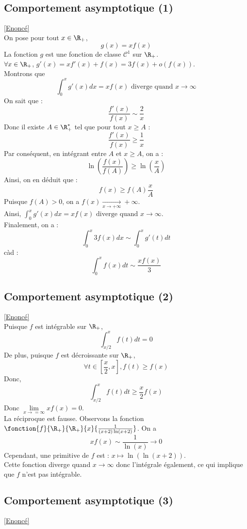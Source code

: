 \documentclass{book}
\begin{document}
	\subsection{Comportement asymptotique (1)}
	\label{Comportement asymptotique (1) corrigé}
	\textcolor{blue}{\hyperref[Comportement asymptotique (1)]{[Enoncé]}}\\
	On pose pour tout $x\in\R_+$, \[g(x)=xf(x)\]
	La fonction $g$ est une fonction de classe $\mathcal{C}^1$ sur $\R_+$.\\
	$\forall x\in\R_+$, $g'(x)=xf'(x)+f(x)=3f(x)+o(f(x))$.\\
	Montrons que \[\int_{0}^{x}g'(x)dx=xf(x) \text{ diverge quand }x\rightarrow \infty\]
	On sait que : \[\frac{f'(x)}{f(x)}\sim \frac{2}{x}\]
	Donc il existe $A\in\R^*_+$ tel que pour tout $x\geq A$ : 
	\[\frac{f'(x)}{f(x)}\geq \frac{1}{x}\]
	Par conséquent, en intégrant entre $A$ et $x\geq A$, on a :
	\[\ln(\frac{f(x)}{f(A)})\geq \ln(\frac{x}{A})\]
	Ainsi, on en déduit que :
	\[f(x)\geq f(A)\frac{x}{A}\]
	Puisque $f(A)>0$, on a $f(x)\underset{x\to+\infty}{\rightarrow}+\infty$.\\
	Ainsi, $\int_{0}^{x}g'(x)dx=xf(x) \text{ diverge quand }x\rightarrow \infty$.\\
	Finalement, on a :
	\[\int_{0}^{x}3f(x)dx\sim \int_{0}^{x}g'(t)dt\]
	càd :
	\[\int_{0}^{x}f(x)dt\sim \frac{xf(x)}{3}\]
	
	
	\subsection{Comportement asymptotique (2)}
	\label{Comportement asymptotique (2) corrigé}
	\textcolor{blue}{\hyperref[Comportement asymptotique (2)]{[Enoncé]}}\\
	Puisque $f$ est intégrable sur $\R_+$, 
	\[\int_{x/2}^{x}f(t)dt=0\]
	De plus, puisque $f$ est décroissante sur $\R_+$,
	\[\forall t\in[\frac{x}{2},x], f(t)\geq f(x)\]
	Donc, \[\int_{x/2}^{x}f(t)dt\geq \frac{x}{2}f(x)\]
	Donc $\lim\limits_{x\to =\infty}xf(x)=0$.\\
	La réciproque est fausse. Observons la fonction $\fonction{f}{\R_+}{\R_+}{x}{\frac{1}{(x+2)\ln(x+2)}}$.
	On a \[xf(x)\sim \frac{1}{\ln(x)}\longrightarrow 0\]
	Cependant, une primitive de $f$ est : $x\mapsto \ln(\ln(x+2))$.\\
	Cette fonction diverge quand $x\to\infty$ donc l'intégrale également, ce qui implique que $f$ n'est pas intégrable.
	\subsection{Comportement asymptotique (3)}
	\label{Comportement asymptotique (3) corrigé}
	\textcolor{blue}{\hyperref[Comportement asymptotique (3)]{[Enoncé]}}\\
	
\end{document}
